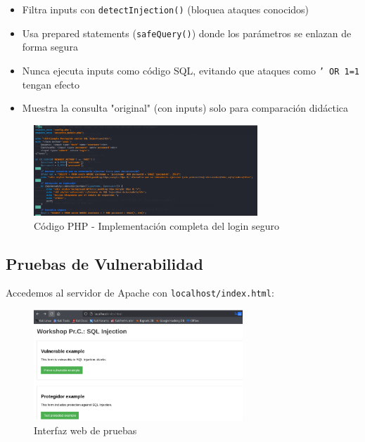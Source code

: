 \documentclass[12pt,a4paper]{article}
\begin{document}
\begin{itemize}
    \item Filtra inputs con \texttt{detectInjection()} (bloquea ataques conocidos)
    \item Usa prepared statements (\texttt{safeQuery()}) donde los parámetros se enlazan
          de forma segura
    \item Nunca ejecuta inputs como código SQL, evitando que ataques como \texttt{' OR
              1=1} tengan efecto
    \item Muestra la consulta "original" (con inputs) solo para comparación didáctica
\end{itemize}

\begin{figure}[H]
    \centering
    \includegraphics[width=0.75\textwidth]{./assets/img8.png}
    \caption{Código PHP - Implementación completa del login seguro}
    \label{fig:php-login-completo}
\end{figure}

\subsection{Pruebas de Vulnerabilidad}

Accedemos al servidor de Apache con \texttt{localhost/index.html}:

\begin{figure}[H]
    \centering
    \includegraphics[width=0.7\textwidth]{./assets/img9.png}
    \caption{Interfaz web de pruebas}
    \label{fig:interfaz-web}
\end{figure}
\end{document}
